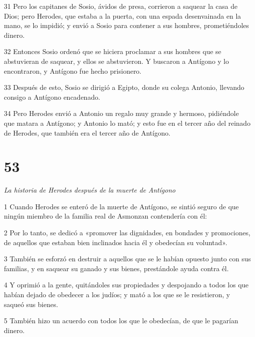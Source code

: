 \par 31 Pero los capitanes de Sosio, ávidos de presa, corrieron a saquear la casa de Dios; pero Herodes, que estaba a la puerta, con una espada desenvainada en la mano, se lo impidió; y envió a Sosio para contener a sus hombres, prometiéndoles dinero.

\par 32 Entonces Sosio ordenó que se hiciera proclamar a sus hombres que se abstuvieran de saquear, y ellos se abstuvieron. Y buscaron a Antígono y lo encontraron, y Antígono fue hecho prisionero.

\par 33 Después de esto, Sosio se dirigió a Egipto, donde su colega Antonio, llevando consigo a Antígono encadenado.

\par 34 Pero Herodes envió a Antonio un regalo muy grande y hermoso, pidiéndole que matara a Antígono; y Antonio lo mató; y esto fue en el tercer año del reinado de Herodes, que también era el tercer año de Antígono.

\chapter{53}

\par \textit{La historia de Herodes después de la muerte de Antígono}

\par 1 Cuando Herodes se enteró de la muerte de Antígono, se sintió seguro de que ningún miembro de la familia real de Asmonzan contendería con él:

\par 2 Por lo tanto, se dedicó a «promover las dignidades, en bondades y promociones, de aquellos que estaban bien inclinados hacia él y obedecían su voluntad».

\par 3 También se esforzó en destruir a aquellos que se le habían opuesto junto con sus familias, y en saquear su ganado y sus bienes, prestándole ayuda contra él.

\par 4 Y oprimió a la gente, quitándoles sus propiedades y despojando a todos los que habían dejado de obedecer a los judíos; y mató a los que se le resistieron, y saqueó sus bienes.

\par 5 También hizo un acuerdo con todos los que le obedecían, de que le pagarían dinero.

